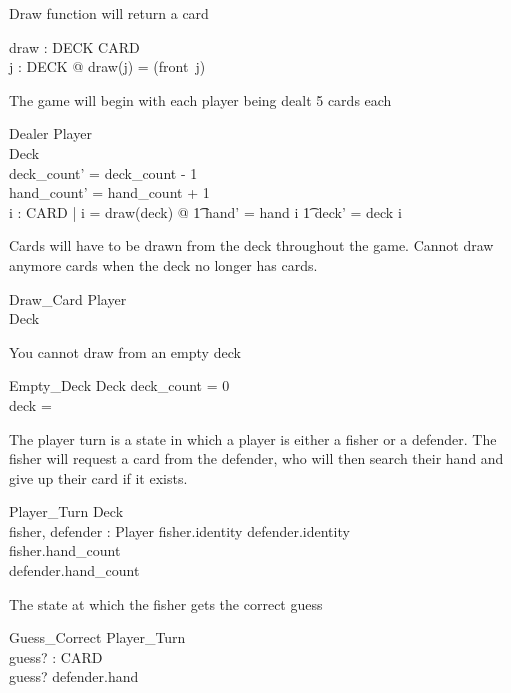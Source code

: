 \documentclass{article}
\begin{document}
Draw function will return a card
\begin{axdef}
    draw : DECK \fun \power CARD\\
    \where
    \forall j : DECK @ draw(j) = (front~j)\\
\end{axdef}

The game will begin with each player being dealt 5 cards each
\begin{schema}{Dealer}
    \Delta Player \\
    \Delta Deck \\
    \where
    deck\_count' = deck\_count - 1\\  
    hand\_count' = hand\_count + 1\\
    \forall i : \power CARD | i = draw(deck) @
    \t1 hand' = hand \cup i \land
    \t1 deck' = deck \setminus i\\ 
\end{schema}

Cards will have to be drawn from the deck throughout the game.
Cannot draw anymore cards when the deck no longer has cards.
\begin{schema}{Draw\_Card}
    \Delta Player\\
    \Delta Deck\\
\end{schema}

You cannot draw from an empty deck
\begin{schema}{Empty\_Deck}
    \Xi Deck
    \where
    deck\_count = 0 \\
    deck = \emptyset
\end{schema}

The player turn is a state in which a player is either a fisher
or a defender. The fisher will request a card from the defender,
who will then search their hand and give up their card if it exists.
\begin{schema}{Player\_Turn}
    \Xi Deck \\
    fisher, defender : Player
    \where
    fisher.identity \neq defender.identity\\
    fisher.hand\_count \\
    defender.hand\_count \\ 
\end{schema}

The state at which the fisher gets the correct guess
\begin{schema}{Guess\_Correct}
    \Delta Player\_Turn \\
    guess? : CARD \\
    \where
    guess? \in defender.hand \\
\end{schema}
\end{document}
